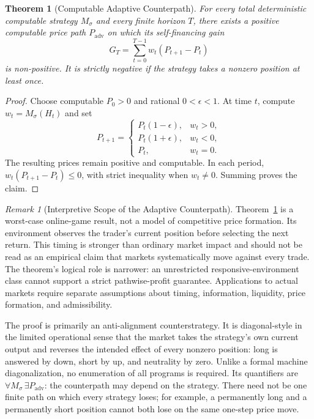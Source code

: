 \documentclass[aps,pra,reprint,superscriptaddress,amsmath,amssymb,floatfix]{revtex4-2}
\theoremstyle{plain}
\newtheorem{theorem}{Theorem}
\theoremstyle{definition}
\theoremstyle{remark}
\newtheorem{remark}{Remark}
\begin{document}
\begin{theorem}[Computable Adaptive Counterpath]
  \label{thm:counterpath}
  For every total deterministic computable strategy \(M_\sigma\) and every
  finite horizon \(T\), there exists a positive computable price path
  \(P_{\mathrm{adv}}\) on which its self-financing gain
  \[
    G_T=\sum_{t=0}^{T-1}w_t(P_{t+1}-P_t)
  \]
  is non-positive. It is strictly negative if the strategy takes a nonzero
  position at least once.
\end{theorem}

\begin{proof}
Choose computable \(P_0>0\) and rational \(0<\epsilon<1\). At time \(t\),
compute \(w_t=M_\sigma(H_t)\) and set
\begin{equation}
P_{t+1}=
\begin{cases}
P_t(1-\epsilon),&w_t>0,\\
P_t(1+\epsilon),&w_t<0,\\
P_t,&w_t=0.
\end{cases}
\label{eq:adversary}
\end{equation}
The resulting prices remain positive and computable. In each period,
\(w_t(P_{t+1}-P_t)\leq0\), with strict inequality when \(w_t\neq0\).
Summing proves the claim.
\end{proof}

\begin{remark}[Interpretive Scope of the Adaptive Counterpath]
\label{rem:counterpath-scope}
Theorem~\ref{thm:counterpath} is a worst-case online-game result, not a model of
competitive price formation. Its environment observes the trader's current
position before selecting the next return. This timing is stronger than
ordinary market impact and should not be read as an empirical claim that
markets systematically move against every trade. The theorem's logical role
is narrower: an unrestricted responsive-environment class cannot support a
strict pathwise-profit guarantee. Applications to actual markets require
separate assumptions about timing, information, liquidity, price formation,
and admissibility.
\end{remark}

The proof is primarily an anti-alignment counterstrategy. It is diagonal-style
in the limited operational sense that the market takes the strategy's own
current output and reverses the intended effect of every nonzero position:
long is answered by down, short by up, and neutrality by zero. Unlike a formal machine
diagonalization, no enumeration of all programs is required. Its quantifiers are
\(\forall M_\sigma\,\exists P_{\mathrm{adv}}\): the counterpath may depend on
the strategy. There need not be one finite path on which every strategy loses;
for example, a permanently long and a permanently short position cannot both
lose on the same one-step price move.
\end{document}

